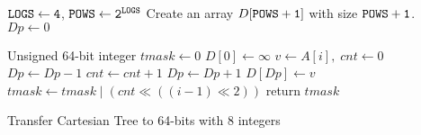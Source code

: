 \begin{algorithm}
\SetAlgoNoLine
{}

$\tt{LOGS} \gets 4$, $\tt{POWS} \gets 2^{\tt{LOGS}}$ \;
Create an array $D[\tt{POWS}+1]$ with size $\tt{POWS}+1$. \;
$\textit{Dp} \gets 0$ \;

Unsigned 64-bit integer $\textit{tmask} \gets 0$ \;
$D[0] \gets \infty$ \;
 {
  $v \gets A[i], \; \textit{cnt} \gets 0$\;
   {
    $\textit{Dp} \gets \textit{Dp}-1$ \;
    $\textit{cnt} \gets \textit{cnt} + 1$ \;
  }
  $\textit{Dp} \gets \textit{Dp}+1$ \;
  $D[\textit{Dp}] \gets v$ \;
  $\textit{tmask} \gets \textit{tmask} \mathrel{|} (cnt \ll ((i-1) \ll 2))$ \;
}
return $tmask$ \;

  \caption{Transfer Cartesian Tree to 64-bits with 8 integers}
  \label{alg:cartesian-to-64bits}
\end{algorithm}